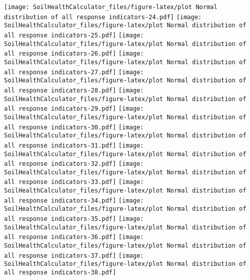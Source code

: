 \documentclass[]{article}
\begin{document}
\texttt{[image: SoilHealthCalculator\_files/figure-latex/plot Normal distribution of all response indicators-24.pdf]}
\texttt{[image: SoilHealthCalculator\_files/figure-latex/plot Normal distribution of all response indicators-25.pdf]}
\texttt{[image: SoilHealthCalculator\_files/figure-latex/plot Normal distribution of all response indicators-26.pdf]}
\texttt{[image: SoilHealthCalculator\_files/figure-latex/plot Normal distribution of all response indicators-27.pdf]}
\texttt{[image: SoilHealthCalculator\_files/figure-latex/plot Normal distribution of all response indicators-28.pdf]}
\texttt{[image: SoilHealthCalculator\_files/figure-latex/plot Normal distribution of all response indicators-29.pdf]}
\texttt{[image: SoilHealthCalculator\_files/figure-latex/plot Normal distribution of all response indicators-30.pdf]}
\texttt{[image: SoilHealthCalculator\_files/figure-latex/plot Normal distribution of all response indicators-31.pdf]}
\texttt{[image: SoilHealthCalculator\_files/figure-latex/plot Normal distribution of all response indicators-32.pdf]}
\texttt{[image: SoilHealthCalculator\_files/figure-latex/plot Normal distribution of all response indicators-33.pdf]}
\texttt{[image: SoilHealthCalculator\_files/figure-latex/plot Normal distribution of all response indicators-34.pdf]}
\texttt{[image: SoilHealthCalculator\_files/figure-latex/plot Normal distribution of all response indicators-35.pdf]}
\texttt{[image: SoilHealthCalculator\_files/figure-latex/plot Normal distribution of all response indicators-36.pdf]}
\texttt{[image: SoilHealthCalculator\_files/figure-latex/plot Normal distribution of all response indicators-37.pdf]}
\texttt{[image: SoilHealthCalculator\_files/figure-latex/plot Normal distribution of all response indicators-38.pdf]}
\end{document}

